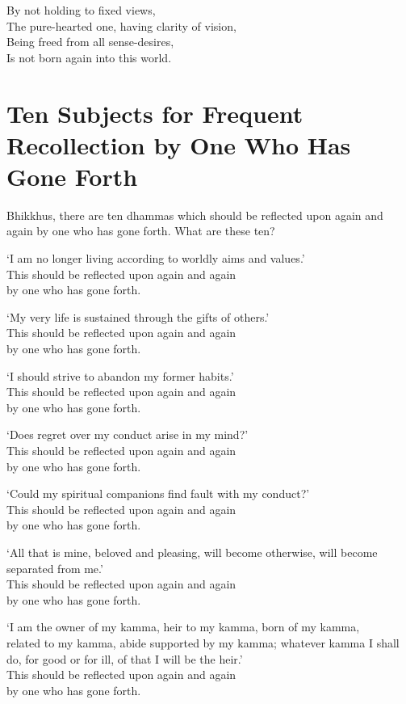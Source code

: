 By not holding to fixed views,\\
The pure-hearted one, having clarity of vision,\\
Being freed from all sense-desires,\\
Is not born again into this world.


\section[Ten Subjects for Frequent Recollection]{Ten Subjects for Frequent Recollection by One Who Has Gone Forth}


Bhikkhus, there are ten dhammas which should be reflected upon again and again by one who has gone forth. What are these ten?

`I am no longer living according to worldly aims and values.'\\
This should be reflected upon again and again\\
by one who has gone forth.

`My very life is sustained through the gifts of others.'\\
This should be reflected upon again and again\\
by one who has gone forth.

`I should strive to abandon my former habits.'\\
This should be reflected upon again and again\\
by one who has gone forth.

`Does regret over my conduct arise in my mind?'\\
This should be reflected upon again and again\\
by one who has gone forth.

`Could my spiritual companions find fault with my conduct?'\\
This should be reflected upon again and again\\
by one who has gone forth.

`All that is mine, beloved and pleasing, will become otherwise, will become separated from me.'\\
This should be reflected upon again and again\\
by one who has gone forth.

`I am the owner of my kamma, heir to my kamma, born of my kamma,\\
related to my kamma, abide supported by my kamma; whatever kamma I shall do, for good or for ill, of that I will be the heir.'\\
This should be reflected upon again and again\\
by one who has gone forth.

